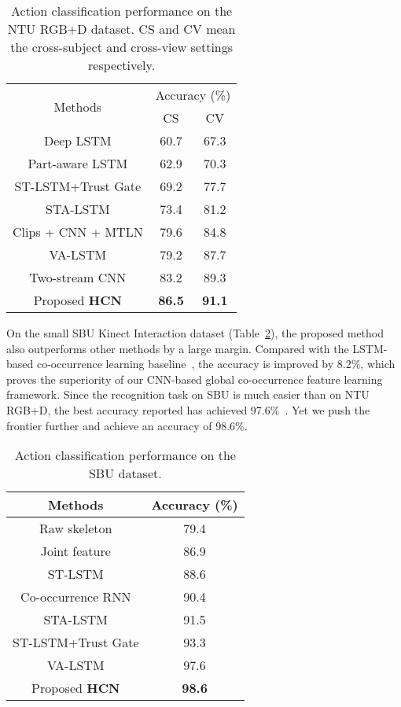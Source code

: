 \documentclass{article}
\begin{document}
\begin{table}[tbp]
  \centering
  \begin{tabular}{c|cc}\hline
    \multirow{2}{*}{Methods} & \multicolumn{2}{c}{Accuracy (\%)} \\
    & CS & CV \\ \hline
    Deep LSTM \cite{NTURGBD} &60.7 &67.3 \\
    Part-aware LSTM \cite{NTURGBD}     &62.9 &70.3 \\
    ST-LSTM+Trust Gate \cite{trust_gate} &69.2 &77.7 \\
    STA-LSTM \cite{song2016end}   &73.4 &81.2 \\
    Clips + CNN + MTLN \cite{Ke_2017_CVPR}  &79.6 &84.8 \\
    VA-LSTM \cite{view_adaptive}    &79.2  &87.7 \\
    Two-stream CNN \cite{Li_2017_ICMEW} &83.2  &89.3 \\
    Proposed {\bfseries HCN}  &{\bfseries 86.5} &{\bfseries 91.1} \\
    \hline
  \end{tabular}
\caption{Action classification performance on the NTU RGB+D dataset. CS and CV mean the cross-subject and cross-view settings respectively.}
  \label{table:NTU}
\end{table}

On the small SBU Kinect Interaction dataset (Table~\ref{table:SBU}), the proposed method also outperforms other methods by a large margin. Compared with the LSTM-based co-occurrence learning baseline~\cite{co_occurrence}, the accuracy is improved by 8.2\%, which proves the superiority of our CNN-based global co-occurrence feature learning framework. Since the recognition task on SBU is much easier than on NTU RGB+D, the best accuracy reported has achieved 97.6\%~\cite{view_adaptive}. Yet we push the frontier further and achieve an accuracy of 98.6\%.

\begin{table}[tbp]
  \centering
  \begin{tabular}{c|c}\hline
    Methods & Accuracy (\%) \\ \hline
    Raw skeleton \cite{Ji2014Interactive} &79.4 \\
    Joint feature \cite{Ji2014Interactive} &86.9 \\
    ST-LSTM \cite{trust_gate} &88.6 \\
    Co-occurrence RNN \cite{co_occurrence} &90.4 \\
    STA-LSTM \cite{song2016end} &91.5 \\
    ST-LSTM+Trust Gate \cite{trust_gate} &93.3 \\
    VA-LSTM \cite{view_adaptive} &97.6 \\
    Proposed \textbf{HCN}  & \textbf{98.6} \\
    \hline
  \end{tabular}
\caption{Action classification performance on the SBU dataset.}
  \label{table:SBU}
\end{table}
\end{document}
